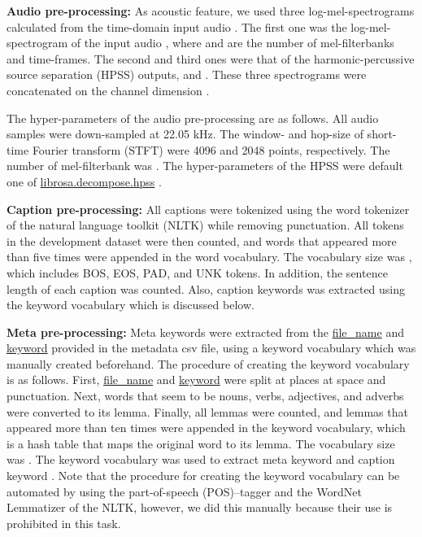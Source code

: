 \documentclass{article}
\begin{document}
\begin{sloppy}
{\bf Audio pre-processing:}
As acoustic feature, we used three log-mel-spectrograms calculated from the time-domain input audio .
The first one was the log-mel-spectrogram of the input audio ,
where  and  are the number of mel-filterbanks and time-frames.
The second and third ones were that of the harmonic-percussive source separation (HPSS) outputs,  and .
These three spectrograms were concatenated on the channel dimension .

The hyper-parameters of the audio pre-processing are as follows.
All audio samples were down-sampled at 22.05 kHz.
The window- and hop-size of short-time Fourier transform (STFT) were 4096 and 2048 points, respectively.
The number of mel-filterbank was .
The hyper-parameters of the HPSS were default one of \url{librosa.decompose.hpss} \cite{hpss}.

\vspace{3pt}
\noindent
{\bf Caption pre-processing:}
All captions were tokenized using the word tokenizer of the natural language toolkit (NLTK) \cite{nltk} while removing punctuation. All tokens in the development dataset were then counted, and words that appeared more than five times were appended in the word vocabulary. The vocabulary size was , which includes BOS, EOS, PAD, and UNK tokens.
In addition, the sentence length  of each caption was counted.
Also, caption keywords  was extracted using the keyword vocabulary which is discussed below.

\vspace{3pt}
\noindent
{\bf Meta pre-processing:} 
Meta keywords were extracted from the \url{file_name} and \url{keyword} provided in the metadata csv file, using a keyword vocabulary which was manually created beforehand.
The procedure of creating the keyword vocabulary is as follows. First, \url{file_name} and \url{keyword} were split at places at space and punctuation. Next, words that seem to be nouns, verbs, adjectives, and adverbs were converted to its lemma. Finally, all lemmas were counted, and lemmas that appeared more than ten times were appended in the keyword vocabulary, which is a hash table that maps the original word to its lemma.
The vocabulary size was .
The keyword vocabulary was used to extract meta keyword  and caption keyword .
Note that the procedure for creating the keyword vocabulary can be automated by using the part-of-speech (POS)--tagger and the WordNet Lemmatizer of the NLTK, however, we did this manually because their use is prohibited in this task.





\end{sloppy}
\end{document}
